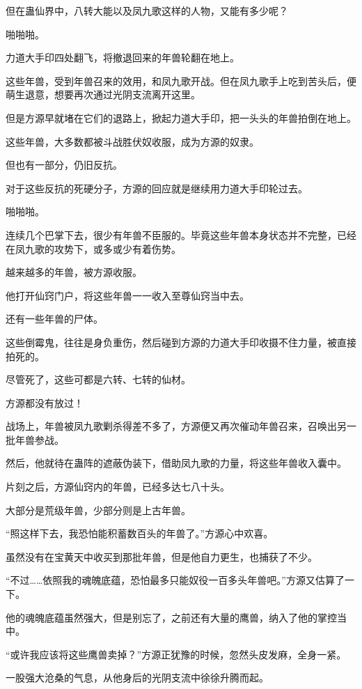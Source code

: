 \begin{this_body}
但在蛊仙界中，八转大能以及凤九歌这样的人物，又能有多少呢？

啪啪啪。

力道大手印四处翻飞，将撤退回来的年兽轮翻在地上。

这些年兽，受到年兽召来的效用，和凤九歌开战。但在凤九歌手上吃到苦头后，便萌生退意，想要再次通过光阴支流离开这里。

但是方源早就堵在它们的退路上，掀起力道大手印，把一头头的年兽拍倒在地上。

这些年兽，大多数都被斗战胜伏奴收服，成为方源的奴隶。

但也有一部分，仍旧反抗。

对于这些反抗的死硬分子，方源的回应就是继续用力道大手印轮过去。

啪啪啪。

连续几个巴掌下去，很少有年兽不臣服的。毕竟这些年兽本身状态并不完整，已经在凤九歌的攻势下，或多或少有着伤势。

越来越多的年兽，被方源收服。

他打开仙窍门户，将这些年兽一一收入至尊仙窍当中去。

还有一些年兽的尸体。

这些倒霉鬼，往往是身负重伤，然后碰到方源的力道大手印收摄不住力量，被直接拍死的。

尽管死了，这些可都是六转、七转的仙材。

方源都没有放过！

战场上，年兽被凤九歌剿杀得差不多了，方源便又再次催动年兽召来，召唤出另一批年兽参战。

然后，他就待在蛊阵的遮蔽伪装下，借助凤九歌的力量，将这些年兽收入囊中。

片刻之后，方源仙窍内的年兽，已经多达七八十头。

大部分是荒级年兽，少部分则是上古年兽。

“照这样下去，我恐怕能积蓄数百头的年兽了。”方源心中欢喜。

虽然没有在宝黄天中收买到那批年兽，但是他自力更生，也捕获了不少。

“不过……依照我的魂魄底蕴，恐怕最多只能奴役一百多头年兽吧。”方源又估算了一下。

他的魂魄底蕴虽然强大，但是别忘了，之前还有大量的鹰兽，纳入了他的掌控当中。

“或许我应该将这些鹰兽卖掉？”方源正犹豫的时候，忽然头皮发麻，全身一紧。

一股强大沧桑的气息，从他身后的光阴支流中徐徐升腾而起。


\end{this_body}
